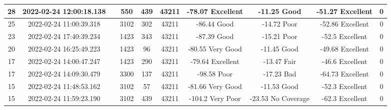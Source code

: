 \begin{longtable*}{|c|c|c|c|c|c|c|c|c|c|}
28&2022-02-24 12:00:18.138&&550&439&43211& -78.07    Excellent   & -11.25    Good        & -51.27    Excellent   & 0\\\hline
{}25&2022-02-24 11:00:39.318&&3102&302&43211& -86.44    Good        & -14.72    Poor        & -52.86    Excellent   & 0\\\hline
{}23&2022-02-24 17:40:39.234&&1423&343&43211& -87.39    Good        & -15.21    Poor        & -52.5     Excellent   & 0\\\hline
{}20&2022-02-24 16:25:49.223&&1423&96&43211& -80.55    Very Good   & -11.45    Good        & -49.68    Excellent   & 0\\\hline
{}17&2022-02-24 14:00:47.247&&1423&290&43211& -79.64    Excellent   & -13.47    Fair        & -46.6     Excellent   & 0\\\hline
{}17&2022-02-24 14:09:30.479&&3300&137&43211& -98.58    Poor        & -17.23    Bad         & -64.73    Excellent   & 0\\\hline
{}15&2022-02-24 11:48:53.162&&3102&57&43211& -81.66    Very Good   & -11.53    Good        & -52.3     Excellent   & 0\\\hline
{}15&2022-02-24 11:59:23.190&&3102&439&43211& -104.2    Very Poor   & -23.53    No Coverage & -62.3     Excellent   & 0\\\hline

\end{longtable*}
